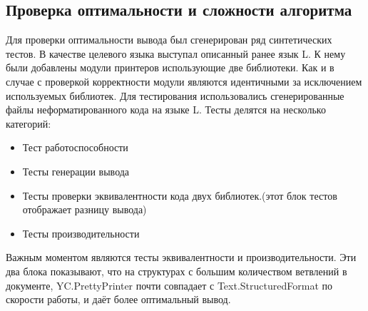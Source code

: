 \documentclass{matmex-diploma}
\begin{document}
\subsection{Проверка оптимальности и сложности алгоритма}
Для проверки оптимальности вывода был сгенерирован ряд синтетических тестов. В качестве целевого языка выступал описанный ранее язык L. К нему были добавлены модули принтеров использующие две библиотеки. Как и в случае с проверкой корректности модули являются идентичными за исключением используемых библиотек. Для тестирования использовались сгенерированные файлы неформатированного кода на языке L. Тесты делятся на несколько категорий:
\begin{itemize}
    \item Тест работоспособности
    \item Тесты генерации вывода
    \item Тесты проверки эквивалентности кода двух библиотек.(этот блок тестов отображает разницу вывода)
    \item Тесты производительности
\end{itemize}
Важным моментом являются тесты эквивалентности и производительности. Эти два блока показывают, что на структурах с большим количеством ветвлений в документе, YC.PrettyPrinter почти совпадает с Text.StructuredFormat по скорости работы, и даёт более оптимальный вывод.
\end{document}

